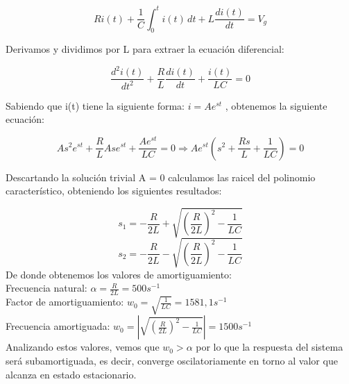 \documentclass{article}
\begin{document}
\begin{equation}
R i(t) + \frac{1}{C} \int_{0}^{t} i(t)\,dt + L \frac{di(t)}{dt}  = V_g
\end{equation}

Derivamos y dividimos por L para extraer la ecuación diferencial:

\begin{equation}
\frac{d^{2} i(t)}{dt^{2}} + \frac{R}{L} \frac{di(t)}{dt} + \frac{i(t)}{LC} = 0
\end{equation}

Sabiendo que i(t) tiene la siguiente forma:  $ i = Ae^{st}$ , obtenemos la siguiente ecuación:

\begin{equation}
A s^{2} e^{st} + \frac{R}{L} A s e^{st} + \frac{A e^{st}}{LC} = 0 
\Rightarrow A e^{st} \left( s^{2} + \frac{R s}{L} + \frac{1}{LC} \right) = 0
\end{equation}

Descartando la solución trivial A = 0 calculamos las raicel del polinomio característico, obteniendo los siguientes resultados:

\begin{equation}
s_{1} = -\frac{R}{2L} + \sqrt{\left( \frac{R}{2L} \right)^{2} - \frac{1}{LC}} 
\end{equation}
\begin{equation}
s_{2} = -\frac{R}{2L} - \sqrt{\left( \frac{R}{2L} \right)^{2} - \frac{1}{LC}}
\end{equation}
De donde obtenemos los valores de amortiguamiento:\\

 Frecuencia natural: $ \alpha = \frac{R}{2L}=500s^{-1}$\\ 
 
 Factor de amortiguamiento: $ w_0 = \sqrt{\frac{1}{LC}}=1581,1 s^{-1}$  \\
 
 Frecuencia amortiguada:  $ w_0 = |\sqrt{\left( \frac{R}{2L} \right)^{2} - \frac{1}{LC}}|=1500 s^{-1}$\\

Analizando estos valores, vemos que $w_0>\alpha$ por lo que la respuesta del sistema será subamortiguada, es decir, converge oscilatoriamente en torno al valor que alcanza en estado estacionario.
\end{document}
